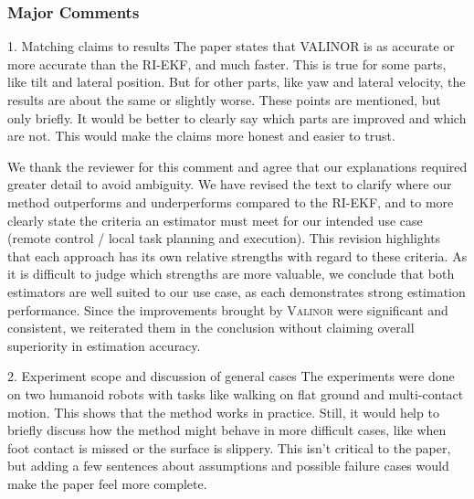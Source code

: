 \subsubsection{Major Comments}

\begin{revquote}
1. Matching claims to results
The paper states that VALINOR is as accurate or more accurate than the RI-EKF, and much faster. This is true for some parts, like tilt and lateral position. But for other parts, like yaw and lateral velocity, the results are about the same or slightly worse. These points are mentioned, but only briefly. It would be better to clearly say which parts are improved and which are not. This would make the claims more honest and easier to trust.
\end{revquote}

We thank the reviewer for this comment and agree that our explanations required greater detail to avoid ambiguity. We have revised the text to clarify where our method outperforms and underperforms compared to the RI-EKF, and to more clearly state the criteria an estimator must meet for our intended use case (remote control / local task planning and execution). This revision highlights that each approach has its own relative strengths with regard to these criteria. As it is difficult to judge which strengths are more valuable, we conclude that both estimators are well suited to our use case, as each demonstrates strong estimation performance. Since the improvements brought by {\scshape Valinor} were significant and consistent, we reiterated them in the conclusion without claiming overall superiority in estimation accuracy.

\begin{revquote} \hypertarget{Comment 2 Rev 3}{}
2. Experiment scope and discussion of general cases
The experiments were done on two humanoid robots with tasks like walking on flat ground and multi-contact motion. This shows that the method works in practice. Still, it would help to briefly discuss how the method might behave in more difficult cases, like when foot contact is missed or the surface is slippery. This isn't critical to the paper, but adding a few sentences about assumptions and possible failure cases would make the paper feel more complete.
\end{revquote}

